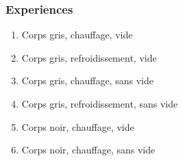 \documentclass{beamer}
\begin{document}
\begin{frame}
\frametitle{Experiences}

\begin{enumerate}
	\item{{\color{gray7}Corps gris}{\color{gray4}, {\color{red}chauffage}, vide}\newline}
	\item{{\color{gray7}Corps gris}{\color{gray4}, {\color{blue5}refroidissement}, vide}\newline}
	\item{{\color{gray7}Corps gris}{\color{gray4}, {\color{red}chauffage}, sans vide}\newline}
	\item{{\color{gray7}Corps gris}{\color{gray4}, {\color{blue5}refroidissement}, sans vide}\newline}
	\item{{\color{black}Corps noir}{\color{gray4}, {\color{red}chauffage}, vide}\newline}
	\item{{\color{black}Corps noir}{\color{gray4}, {\color{red}chauffage}, sans vide}\newline}

\end{enumerate}
\end{frame}
\end{document}
